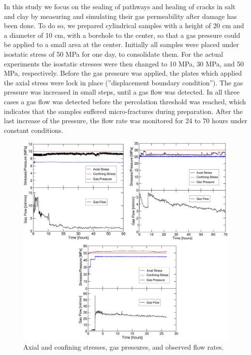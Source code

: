 In this study we focus on the sealing of pathways and healing of cracks in salt and clay by measuring and simulating their gas permeability after damage has been done. To do so, we prepared cylindrical samples with a height of 20 cm and a diameter of 10 cm, with a borehole to the center, so that a gas pressure could be applied to a small area at the center. Initially all samples were placed under isostatic stress of 50 MPa for one day, to consolidate them. For the actual experiments the isostatic stresses were then changed to 10 MPa, 30 MPa, and 50 MPa, respectively. Before the gas pressure was applied, the plates which applied the axial stress were lock in place (''displacement boundary condition''). The gas pressure was increased in small steps, until a gas flow was detected. In all three cases a gas flow was detected before the percolation threshold was reached, which indicates that the samples suffered micro-fractures during preparation. After the last increase of the pressure, the flow rate was monitored for 24 to 70 hours under constant conditions.

\begin{figure}[!ht]
\centering
\includegraphics[width=1\textwidth]{figures/mex3-stresses-flows-v2.png}
\caption{Axial and confining stresses, gas pressures, and observed flow rates.}
\label{fig:ME3-stresses-flows}
\end{figure}
 
